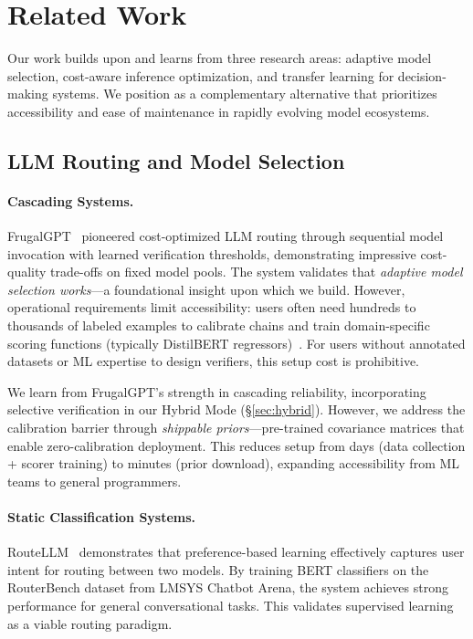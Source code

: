 
\section{Related Work}
\label{sec:related}

Our work builds upon and learns from three research areas: adaptive model selection, cost-aware inference optimization, and transfer learning for decision-making systems. We position \ours{} as a complementary alternative that prioritizes accessibility and ease of maintenance in rapidly evolving model ecosystems.

\subsection{LLM Routing and Model Selection}

\paragraph{Cascading Systems.} FrugalGPT~\cite{chen2023frugalgpt} pioneered cost-optimized LLM routing through sequential model invocation with learned verification thresholds, demonstrating impressive cost-quality trade-offs on fixed model pools. The system validates that \emph{adaptive model selection works}---a foundational insight upon which we build. However, operational requirements limit accessibility: users often need hundreds to thousands of labeled examples to calibrate chains and train domain-specific scoring functions (typically DistilBERT regressors)~\cite{chen2023frugalgpt}. For users without annotated datasets or ML expertise to design verifiers, this setup cost is prohibitive.

We learn from FrugalGPT's strength in cascading reliability, incorporating selective verification in our Hybrid Mode (\S\ref{sec:hybrid}). However, we address the calibration barrier through \emph{shippable priors}---pre-trained covariance matrices that enable zero-calibration deployment. This reduces setup from days (data collection + scorer training) to minutes (prior download), expanding accessibility from ML teams to general programmers.

\paragraph{Static Classification Systems.} RouteLLM~\cite{ong2024routellm} demonstrates that preference-based learning effectively captures user intent for routing between two models. By training BERT classifiers on the RouterBench dataset from LMSYS Chatbot Arena, the system achieves strong performance for general conversational tasks. This validates supervised learning as a viable routing paradigm.


